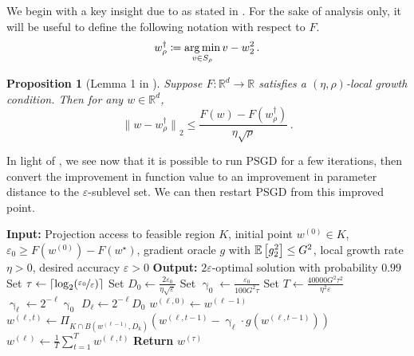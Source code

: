 \documentclass[11pt,letterpaper]{article}
\theoremstyle{plain}
\newtheorem{proposition}[theorem]{Proposition}
\theoremstyle{definition}
\theoremstyle{remark}
\newcommand{\inparen}[1]{\ensuremath{\left(#1\right)}}
\newcommand{\insquare}[1]{\ensuremath{\left[#1\right]}}
\newcommand{\ceil}[1]{\ensuremath{\left\lceil#1\right\rceil}}
\newcommand{\snorm}[1]{\ensuremath{\ensuremath{\| #1 \|}}}
\let\norm\relax
\newcommand{\norm}[1]{\ensuremath{\left\lVert #1 \right\rVert}}
\newcommand{\R}{\mathbb{R}}
\newcommand{\E}{\operatornamewithlimits{\mathbb{E}}}
\newcommand{\argmin}{\operatornamewithlimits{arg\,min}}
\newcommand{\nfrac}[2]{\nicefrac{#1}{#2}}
\newcommand{\eps}{\varepsilon}
\renewcommand{\epsilon}{\varepsilon}
\renewcommand{\gamma}{\upgamma}
\newcommand{\wstar}{{w^\star}}
\begin{document}
{{{We begin with a key insight due to \citet{yang2018beating} as stated in \cite{xu2019accelerate}.
For the sake of analysis only,
it will be useful to define the following notation with respect to $F$.
\[
    w_\rho^\dagger
    \coloneqq \argmin_{v\in S_\rho} \norm{v-w}_2^2\,.
\]
\begin{proposition}[Lemma 1 in \cite{xu2019accelerate}]\label{prop:level-set-dist}
    Suppose $F\colon \R^d\to \R$ satisfies a $(\eta, \rho)$-local growth condition.
    Then for any $w\in \R^d$,
    \[
        \snorm{w-w_\rho^\dagger}_2
        \leq \frac{F(w) - F(w_\rho^\dagger)}{\eta \sqrt{\rho}}\,.
    \]
\end{proposition}
In light of ,
we see now that it is possible to run PSGD for a few iterations,
then convert the improvement in function value to an improvement in parameter distance to the $\eps$-sublevel set.
We can then restart PSGD from this improved point.

\begin{algorithm}[t]
\caption{Iterative-PSGD($K, w_0, \epsilon_0, g, \eps$)}\label{alg:SGD-local-growth-convergence}
\begin{algorithmic}[1]
    \State \textbf{Input:} Projection access to feasible region $K$,
    initial point $w^{(0)}\in K$, 
    $\epsilon_0\geq F(w^{(0)}) - F(\wstar)$,
    gradient oracle $g$ with $\E\insquare{\norm{g}_2^2}\leq G^2$,
    local growth rate $\eta > 0$,
    desired accuracy $\eps > 0$
    \State \textbf{Output:} $2\eps$-optimal solution with probability $0.99$
    \vspace{0.2em}
    \State Set $\tau \gets \ceil{\log_2(\nfrac{\eps_0}\eps)}$
    \vspace{0.2em}
    \State Set $D_0 \gets \frac{2\eps_0}{\eta \sqrt{\eps}}$
    \vspace{0.2em}
    \State Set $\gamma_0 \gets \frac{\eps_0}{100G^2\tau}$
    \vspace{0.2em}
    \State Set $T \gets \frac{40000 G^2 \tau^2}{\eta^2\eps}$
    \vspace{0.2em}
        \State $\gamma_\ell \gets 2^{-\ell}\gamma_0$
        \State $D_\ell\gets 2^{-\ell}D_0$
        \State $w^{(\ell, 0)} \gets w^{(\ell-1)}$
            \State $w^{(\ell, t)} \gets \Pi_{K\cap B(w^{(\ell-1)}, D_k)} \inparen{w^{(\ell, t-1)} - \gamma_\ell\cdot g(w^{(\ell, t-1)})}$
        \EndFor
        \State $w^{(\ell)} \gets \frac1T \sum_{t=1}^T w^{(\ell, t)}$
    \EndFor
    \vspace{1em}
    \State \textbf{Return} $w^{(\tau)}$
\end{algorithmic}
\end{algorithm}


}}}
\end{document}
